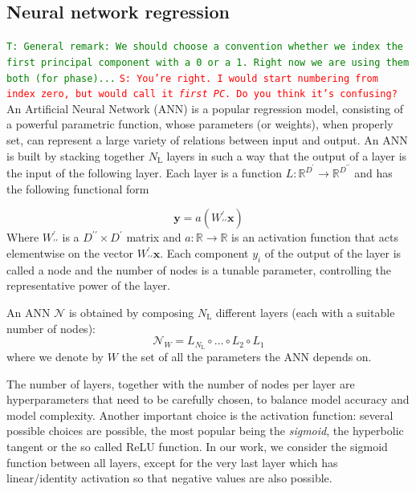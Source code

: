 \documentclass[twocolumn,showpacs,preprintnumbers,nofootinbib,prd,
superscriptaddress,10pt]{revtex4-1}
\newcommand{\R}{\mathbb{R}}
\newcommand{\stefano}[1]{{\textcolor{red}{\texttt{S: #1}} }}
\newcommand{\tim}[1]{{\textcolor{green}{\texttt{T: #1}} }}
\begin{document}

\subsection{Neural network regression}
\label{sec:NN}

\tim{General remark: We should choose a convention whether we index the first principal component with a 0 or a 1. Right now we are using them both (for phase)...}
\stefano{You're right. I would start numbering from index zero, but would call it {\it first PC}. Do you think it's confusing?}
An Artificial Neural Network (ANN) is a popular regression model, consisting of a powerful parametric function, whose parameters (or weights), when properly set, can represent a large variety of relations between input and output.
An ANN is built by stacking together $N_\text{L}$ layers in such a way that the output of a layer is the input of the following layer. Each layer is a function $L: \R^{D^\prime} \rightarrow \R^{D^{\prime\prime}} $ and has the following functional form

\begin{equation}
	\boldsymbol{y} = a(W^{\prime}_{\prime\prime}\boldsymbol{x})
\end{equation}
%
Where $W^{\prime}_{\prime\prime}$ is a $D^{\prime\prime} \times D^{\prime}$ matrix and $a: \R \rightarrow \R$ is an activation function that acts elementwise on the vector $W^{\prime}_{\prime\prime}\boldsymbol{x}$.
Each component $y_i$ of the output of the layer is called a node and the number of nodes is a tunable parameter, controlling the representative power of the layer.

An ANN $\mathcal{N}$ is obtained by composing $N_\text{L}$ different layers (each with a suitable number of nodes):
%
\begin{equation}
	\mathcal{N}_W = L_{N_\text{L}} \circ \hdots \circ L_2 \circ L_1
\end{equation}
%
where we denote by $W$ the set of all the parameters the ANN depends on.

The number of layers, together with the number of nodes per layer are hyperparameters that need to be carefully chosen, to balance model accuracy and model complexity.
Another important choice is the activation function: several possible choices are possible, the most popular being the {\it sigmoid}, the hyperbolic tangent or the so called ReLU function. In our work, we consider the sigmoid function between all layers, except for the very last layer which has linear/identity activation so that negative values are also possible.
\end{document}
